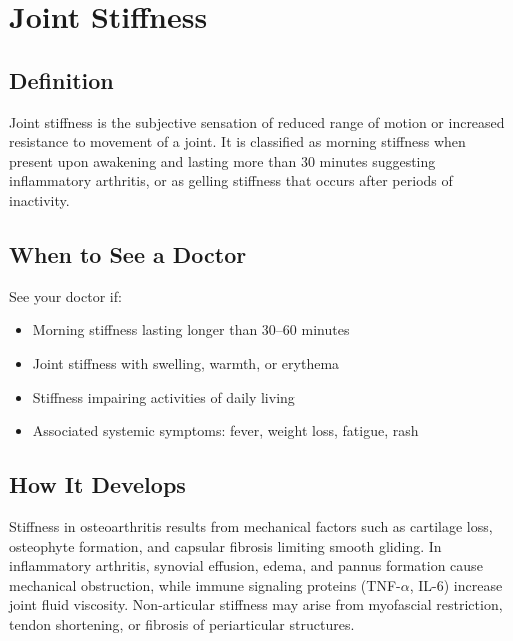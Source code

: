 \chapter{Joint Stiffness}

\section*{Definition}
Joint stiffness is the subjective sensation of reduced range of motion or increased resistance to movement of a joint. It is classified as morning stiffness when present upon awakening and lasting more than 30 minutes suggesting inflammatory arthritis, or as gelling stiffness that occurs after periods of inactivity.

\section*{When to See a Doctor}
See your doctor if:
\begin{itemize}
  \item Morning stiffness lasting longer than 30--60 minutes
  \item Joint stiffness with swelling, warmth, or erythema
  \item Stiffness impairing activities of daily living
  \item Associated systemic symptoms: fever, weight loss, fatigue, rash
\end{itemize}

\section*{How It Develops}
Stiffness in osteoarthritis results from mechanical factors such as cartilage loss, osteophyte formation, and capsular fibrosis limiting smooth gliding. In inflammatory arthritis, synovial effusion, edema, and pannus formation cause mechanical obstruction, while immune signaling proteins (TNF-$\alpha$, IL-6) increase joint fluid viscosity. Non-articular stiffness may arise from myofascial restriction, tendon shortening, or fibrosis of periarticular structures.

